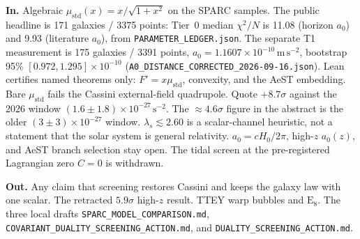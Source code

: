 \begin{tcolorbox}[colback=boxbg,colframe=primary,title={In the jewel / not in the jewel (2026-10-17)},fonttitle=\bfseries]
\textbf{In.}
Algebraic $\mu_{\mathrm{std}}(x)=x/\sqrt{1+x^2}$ on the SPARC samples.
The public headline is 171 galaxies / 3375 points: Tier~0 median $\chi^2/N$ is 11.08 (horizon $a_0$) and 9.93 (literature $a_0$), from \texttt{PARAMETER\_LEDGER.json}.
The separate T1 measurement is 175 galaxies / 3391 points, $a_0=1.1607\times10^{-10}\,\mathrm{m\,s^{-2}}$, bootstrap 95\% $[0.972,1.295]\times10^{-10}$ (\texttt{A0\_DISTANCE\_CORRECTED\_2026-09-16.json}).
Lean certifies named theorems only: $F'=x\mu_{\mathrm{std}}$, convexity, and the AeST embedding.
Bare $\mu_{\mathrm{std}}$ fails the Cassini external-field quadrupole.
Quote $+8.7\sigma$ against the 2026 window $(1.6\pm1.8)\times10^{-27}\,\mathrm{s^{-2}}$.
The $\approx4.6\sigma$ figure in the abstract is the older $(3\pm3)\times10^{-27}$ window.
$\lambda_s\lesssim2.60$ is a scalar-channel heuristic, not a statement that the solar system is general relativity.
$a_0=cH_0/2\pi$, high-$z$ $a_0(z)$, and AeST branch selection stay open.
The tidal screen at the pre-registered Lagrangian zero $C=0$ is withdrawn.

\textbf{Out.}
Any claim that screening restores Cassini and keeps the galaxy law with one scalar.
The retracted $5.9\sigma$ high-$z$ result.
TTEY warp bubbles and $\mathrm{E}_8$.
The three local drafts \texttt{SPARC\_MODEL\_COMPARISON.md}, \texttt{COVARIANT\_DUALITY\_SCREENING\_ACTION.md}, and \texttt{DUALITY\_SCREENING\_ACTION.md}.
\end{tcolorbox}
\vspace{0.6em}
